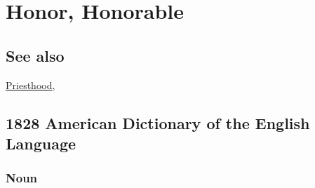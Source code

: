 \section{Honor, Honorable}
	\label{HONOR}
	
\subsection{See also}

	\hyperref[PRIESTHOOD]{Priesthood},

\subsection{1828 American Dictionary of the English Language} %
	\label{HONOR-1828}
	
	\subsubsection{Noun}

